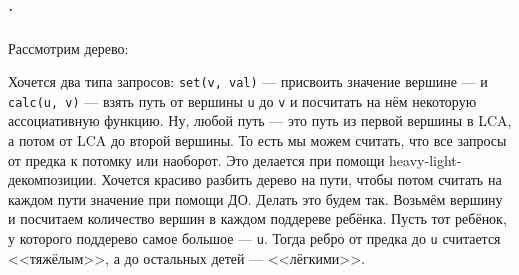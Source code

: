 \documentclass{article}
\newcommand{\pseudo}{PseudoLexer.py:PseudoLexer -x}
\newcommand{\pseudocode}[1]{\texttt{#1}}
\begin{document}
    \subparagraph{.}
    Рассмотрим дерево:
    \begin{figure}[H]
    \end{figure}\noindent
    Хочется два типа запросов: \pseudocode{set(v, val)} --- присвоить значение вершине --- и \pseudocode{calc(u, v)} --- взять путь от вершины \pseudocode{u} до \pseudocode{v} и посчитать на нём некоторую ассоциативную функцию. Ну, любой путь --- это путь из первой вершины в LCA, а потом от LCA до второй вершины. То есть мы можем считать, что все запросы от предка к потомку или наоборот. Это делается при помощи heavy-light-декомпозиции. Хочется красиво разбить дерево на пути, чтобы потом считать на каждом пути значение при помощи ДО. Делать это будем так. Возьмём вершину и посчитаем количество вершин в каждом поддереве ребёнка. Пусть тот ребёнок, у которого поддерево самое большое --- \pseudocode{u}. Тогда ребро от предка до \pseudocode{u} считается <<тяжёлым>>, а до остальных детей --- <<лёгкими>>.
\end{document}
